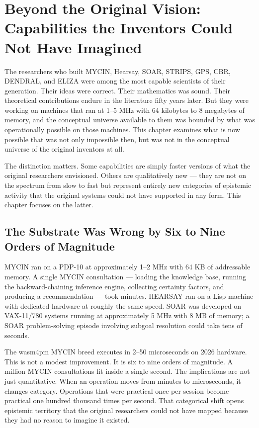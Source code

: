 
\chapter{Beyond the Original Vision: Capabilities the Inventors Could Not Have Imagined}
\label{ch:inventors}

The researchers who built MYCIN, Hearsay, SOAR, STRIPS, GPS, CBR, DENDRAL, and ELIZA were among
the most capable scientists of their generation. Their ideas were correct. Their mathematics was
sound. Their theoretical contributions endure in the literature fifty years later. But they were
working on machines that ran at 1--5 MHz with 64 kilobytes to 8 megabytes of memory, and the
conceptual universe available to them was bounded by what was operationally possible on those
machines. This chapter examines what is now possible that was not only impossible then, but was
not in the conceptual universe of the original inventors at all.

The distinction matters. Some capabilities are simply faster versions of what the original
researchers envisioned. Others are qualitatively new --- they are not on the spectrum from slow to
fast but represent entirely new categories of epistemic activity that the original systems could
not have supported in any form. This chapter focuses on the latter.

\section{The Substrate Was Wrong by Six to Nine Orders of Magnitude}
\label{sec:substrate}

MYCIN ran on a PDP-10 at approximately 1--2 MHz with 64 KB of addressable memory. A single
MYCIN consultation --- loading the knowledge base, running the backward-chaining inference
engine, collecting certainty factors, and producing a recommendation --- took minutes. HEARSAY
ran on a Lisp machine with dedicated hardware at roughly the same speed. SOAR was developed on
VAX-11/780 systems running at approximately 5 MHz with 8 MB of memory; a SOAR problem-solving
episode involving subgoal resolution could take tens of seconds.

The wasm4pm MYCIN breed executes in 2--50 microseconds on 2026 hardware. This is not a
modest improvement. It is six to nine orders of magnitude. A million MYCIN consultations fit
inside a single second. The implications are not just quantitative. When an operation moves from
minutes to microseconds, it changes category. Operations that were practical once per session
become practical one hundred thousand times per second. That categorical shift opens epistemic
territory that the original researchers could not have mapped because they had no reason to
imagine it existed.

